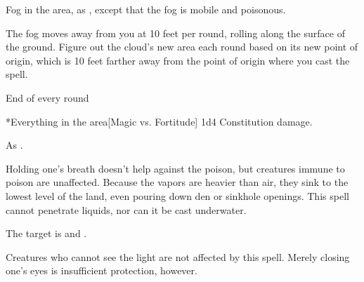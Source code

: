 \begin{spellheader}
    \spelldur{\durshort}
\end{spellheader}
\begin{spelleffects}
    \spelleffect Fog in the area, as , except that the fog is mobile and poisonous.

    \par The fog moves away from you at 10 feet per round, rolling along the surface of the ground. Figure out the cloud's new area each round based on its new point of origin, which is 10 feet farther away from the point of origin where you cast the spell.
    \begin{spelltrigger}{End of every round}
        \begin{spelltargets}*{Everything in the area}[Magic vs. Fortitude]
            \spellsuccess 1d4 Constitution damage.
        \end{spelltargets}
    \end{spelltrigger}
\end{spelleffects}
\begin{spellfooter}
    \spellnotes As .

    Holding one's breath doesn't help against the poison, but creatures immune to poison are unaffected. Because the vapors are heavier than air, they sink to the lowest level of the land, even pouring down den or sinkhole openings. This spell cannot penetrate liquids, nor can it be cast underwater.
\end{spellfooter}

\begin{spellheader}
\end{spellheader}
\begin{spelleffects}
    \begin{spelltargets}
        \spellsuccess The target is \dazzled and \bewildered.
    \end{spelltargets}
\end{spelleffects}
\begin{spellfooter}
    \spellnotes Creatures who cannot see the light are not affected by this spell. Merely closing one's eyes is insufficient protection, however.
\end{spellfooter}

